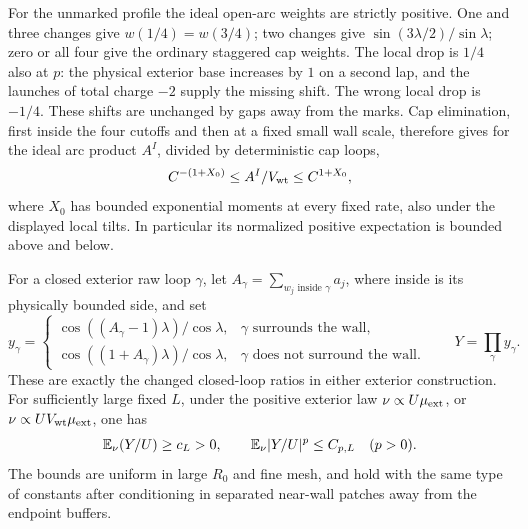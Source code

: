 For the unmarked profile the ideal open-arc weights are strictly
positive.  One and three changes give $w(1/4)=w(3/4)$; two changes
give $\sin(3\lambda/2)/\sin\lambda$; zero or all four give the
ordinary staggered cap weights.  The local drop is $1/4$ also at
$p$: the physical exterior base increases by $1$ on a second lap,
and the launches of total charge $-2$ supply the missing shift.
The wrong local drop is $-1/4$.  These shifts are unchanged by
gaps away from the marks.  Cap elimination, first inside the four
cutoffs and then at a fixed small wall scale, therefore gives for
the ideal arc product $A^I$, divided by deterministic cap loops,
\begin{equation}
 C^{-(1+X_0)}\le A^I/V_{\rm wt}\le C^{1+X_0},
 \label{obs:ideal-positive}
\end{equation}
where $X_0$ has bounded exponential moments at every fixed rate,
also under the displayed local tilts.  In particular its normalized
positive expectation is bounded above and below.

\begin{lemma}
\label{lem:obs-distant}
For a closed exterior raw loop $\gamma$, let
$A_\gamma=\sum_{w_j\text{ inside }\gamma}a_j$, where inside is
its physically bounded side, and set
\begin{equation}
 y_\gamma=
 \begin{cases}
 \cos((A_\gamma-1)\lambda)/\cos\lambda,
       &\gamma\text{ surrounds the wall},\\
 \cos((1+A_\gamma)\lambda)/\cos\lambda,
       &\gamma\text{ does not surround the wall}.
 \end{cases}
 \qquad Y=\prod_\gamma y_\gamma.
 \label{obs:closed-loop-ratios}
\end{equation}
These are exactly the changed closed-loop ratios in either exterior
construction.  For sufficiently large fixed $L$, under the positive
exterior law $\nu\propto U\mu_{\rm ext}$, or
$\nu\propto UV_{\rm wt}\mu_{\rm ext}$, one has
\begin{equation}
 \mathbb E_\nu(Y/U)\ge c_L>0,
 \qquad \mathbb E_\nu|Y/U|^p\le C_{p,L}\quad(p>0).
 \label{obs:distant-bounds}
\end{equation}
The bounds are uniform in large $R_0$ and fine mesh, and hold with
the same type of constants after conditioning in separated
near-wall patches away from the endpoint buffers.
\end{lemma}

